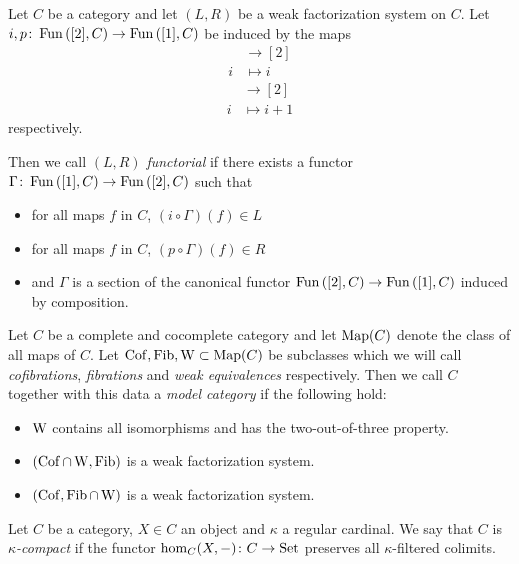\begin{definition}
    Let $C$ be a category and let $(L,R)$ be a weak factorization system on $C$.
    Let $i,p\colon\operatorname{Fun}\left([2],C\right)\to\operatorname{Fun}\left([1],C\right)$ be induced by the maps
    \begin{align*}
        [1]&\to[2]\\
        i&\mapsto i
    \end{align*}
    \begin{align*}
        [1]&\to[2]\\
        i&\mapsto i+1
    \end{align*}
    respectively.

    Then we call $(L,R)$ \emph{functorial} if there exists a functor $\Gamma\colon\operatorname{Fun}\left([1],C\right)\to\operatorname{Fun}\left([2],C\right)$ such that
    \begin{itemize}
        \item for all maps $f$ in $C$, $(i\circ\Gamma)(f)\in L$
        \item for all maps $f$ in $C$, $(p\circ\Gamma)(f)\in R$
        \item and $\Gamma$ is a section of the canonical functor $\operatorname{Fun}\left([2],C\right)\to\operatorname{Fun}\left([1],C\right)$ induced by composition.
    \end{itemize}
\end{definition}
\begin{definition}
    Let $C$ be a complete and cocomplete category and let $\operatorname{Map}(C)$ denote the class of all maps of $C$.
    Let $\operatorname{Cof},\operatorname{Fib},\operatorname{W}\subset\operatorname{Map}(C)$ be subclasses which we will call \emph{cofibrations}, \emph{fibrations} and \emph{weak equivalences} respectively.
    Then we call $C$ together with this data a \emph{model category} if the following hold:
    \begin{itemize}
        \item $\operatorname{W}$ contains all isomorphisms and has the two-out-of-three property.
        \item $(\operatorname{Cof}\cap\operatorname{W},\operatorname{Fib})$ is a weak factorization system.
        \item $(\operatorname{Cof},\operatorname{Fib}\cap\operatorname{W})$ is a weak factorization system.
    \end{itemize}
\end{definition}
\begin{definition}
    Let $C$ be a category, $X\in C$ an object and $\kappa$ a regular cardinal.
    We say that $C$ is \emph{$\kappa$-compact} if the functor $\hom_C(X,-)\colon C\to\operatorname{Set}$ preserves all $\kappa$-filtered colimits. %
\end{definition}
